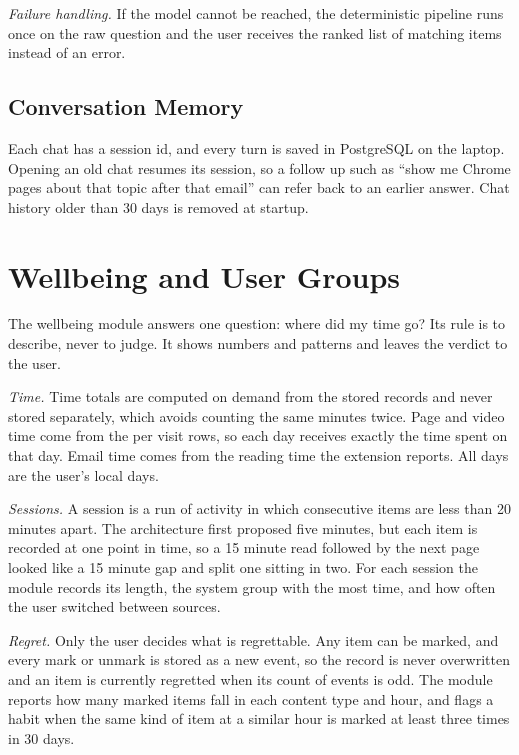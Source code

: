 \documentclass[conference]{IEEEtran}
\begin{document}
\textit{Failure handling.} If the model cannot be reached, the deterministic pipeline runs once on the raw question and the user receives the ranked list of matching items instead of an error.

\subsection{Conversation Memory}
Each chat has a session id, and every turn is saved in PostgreSQL on the laptop. Opening an old chat resumes its session, so a follow up such as ``show me Chrome pages about that topic after that email'' can refer back to an earlier answer. Chat history older than 30 days is removed at startup.

\section{Wellbeing and User Groups}\label{sec:wba}
The wellbeing module answers one question: where did my time go? Its rule is to describe, never to judge. It shows numbers and patterns and leaves the verdict to the user.

\textit{Time.} Time totals are computed on demand from the stored records and never stored separately, which avoids counting the same minutes twice. Page and video time come from the per visit rows, so each day receives exactly the time spent on that day. Email time comes from the reading time the extension reports. All days are the user's local days.

\textit{Sessions.} A session is a run of activity in which consecutive items are less than 20 minutes apart. The architecture first proposed five minutes, but each item is recorded at one point in time, so a 15 minute read followed by the next page looked like a 15 minute gap and split one sitting in two. For each session the module records its length, the system group with the most time, and how often the user switched between sources.

\textit{Regret.} Only the user decides what is regrettable. Any item can be marked, and every mark or unmark is stored as a new event, so the record is never overwritten and an item is currently regretted when its count of events is odd. The module reports how many marked items fall in each content type and hour, and flags a habit when the same kind of item at a similar hour is marked at least three times in 30 days.
\end{document}
